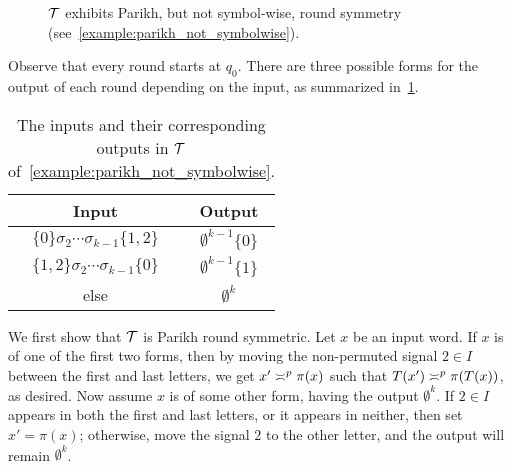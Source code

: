 \begin{example}
\begin{figure}[ht]
	\caption{$\cT$ exhibits Parikh, but not symbol-wise, round symmetry (see~\cref{example:parikh_not_symbolwise}).}
	\label{fig:example_parikh_not_symbolwise}
\end{figure}

Observe that every round starts at $q_0$. There are three possible forms for the output of each round depending on the input, as summarized in~\cref{tab:example_parikh_not_symbolwise}.

\begin{table}[!htb]
    \centering
    \caption{The inputs and their corresponding outputs in $\cT$ of~\cref{example:parikh_not_symbolwise}.}
    \vspace{2mm}
    \def\arraystretch{1.3}
    \begin{tabular}{c|c}
        Input & Output \\
        \hline \hline
        $\{0\}\sigma_2\cdots \sigma_{k-1}\{1,2\}$ & $\emptyset^{k-1} \{0\}$ \\
        \hline
        $\{1,2\}\sigma_2\cdots \sigma_{k-1}\{0\}$ & $\emptyset^{k-1} \{1\}$ \\
        \hline
        else & $\emptyset^k$ \\
    \end{tabular}
    \label{tab:example_parikh_not_symbolwise}
\end{table}

We first show that $\cT$ is Parikh round symmetric. Let $x$ be an input word. If $x$ is of one of the first two forms, then by moving the non-permuted signal $2\in I$ between the first and last letters, we get $x'\req[]^p \pi(x)$ such that $T(x')\req[]^p \pi(T(x))$, as desired. Now assume $x$ is of some other form, having the output $\emptyset^k$. If $2\in I$ appears in both the first and last letters, or it appears in neither, then set $x'=\pi(x)$; otherwise, move the signal $2$ to the other letter, and the output will remain $\emptyset^k$.


\end{example}
